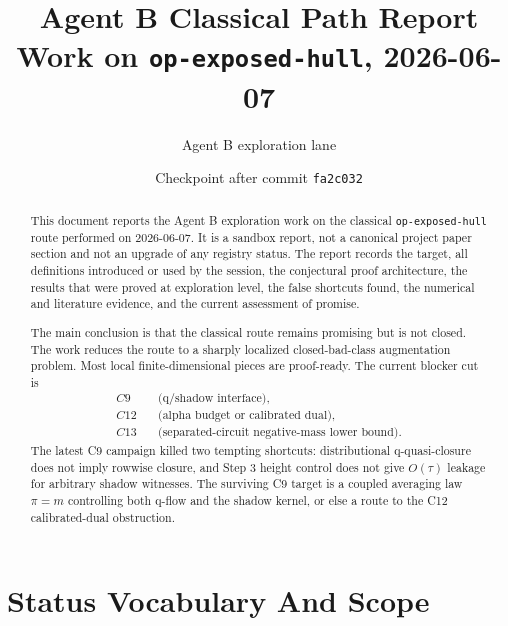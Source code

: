 \documentclass[11pt]{article}
\title{Agent B Classical Path Report\\
\large Work on \texttt{op-exposed-hull}, 2026-06-07}
\author{Agent B exploration lane}
\date{Checkpoint after commit \texttt{fa2c032}}
\theoremstyle{definition}
\begin{document}
\maketitle

\begin{abstract}
This document reports the Agent B exploration work on the classical
\texttt{op-exposed-hull} route performed on 2026-06-07.  It is a sandbox
report, not a canonical project paper section and not an upgrade of any
registry status.  The report records the target, all definitions introduced
or used by the session, the conjectural proof architecture, the results that
were proved at exploration level, the false shortcuts found, the numerical
and literature evidence, and the current assessment of promise.

The main conclusion is that the classical route remains promising but is not
closed.  The work reduces the route to a sharply localized closed-bad-class
augmentation problem.  Most local finite-dimensional pieces are
proof-ready.  The current blocker cut is
\[
\begin{aligned}
  C9  &\quad\text{(q/shadow interface)},\\
  C12 &\quad\text{(alpha budget or calibrated dual)},\\
  C13 &\quad\text{(separated-circuit negative-mass lower bound)}.
\end{aligned}
\]
The latest C9 campaign killed two tempting shortcuts: distributional
q-quasi-closure does not imply rowwise closure, and Step 3 height control
does not give \(O(\tau)\) leakage for arbitrary shadow witnesses.  The
surviving C9 target is a coupled averaging law \(\pi=m\) controlling both
q-flow and the shadow kernel, or else a route to the C12 calibrated-dual
obstruction.
\end{abstract}

\tableofcontents

\section{Status Vocabulary And Scope}
\end{document}
